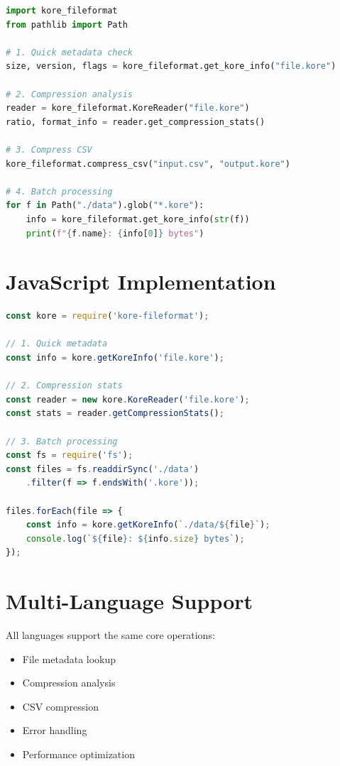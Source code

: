 \documentclass[12pt,a4paper]{report}
\begin{document}
\begin{lstlisting}[language=Python]
import kore_fileformat
from pathlib import Path

# 1. Quick metadata check
size, version, flags = kore_fileformat.get_kore_info("file.kore")

# 2. Compression analysis
reader = kore_fileformat.KoreReader("file.kore")
ratio, format_info = reader.get_compression_stats()

# 3. Compress CSV
kore_fileformat.compress_csv("input.csv", "output.kore")

# 4. Batch processing
for f in Path("./data").glob("*.kore"):
    info = kore_fileformat.get_kore_info(str(f))
    print(f"{f.name}: {info[0]} bytes")
\end{lstlisting}

\section{JavaScript Implementation}

\begin{lstlisting}[language=JavaScript]
const kore = require('kore-fileformat');

// 1. Quick metadata
const info = kore.getKoreInfo('file.kore');

// 2. Compression stats
const reader = new kore.KoreReader('file.kore');
const stats = reader.getCompressionStats();

// 3. Batch processing
const fs = require('fs');
const files = fs.readdirSync('./data')
    .filter(f => f.endsWith('.kore'));

files.forEach(file => {
    const info = kore.getKoreInfo(`./data/${file}`);
    console.log(`${file}: ${info.size} bytes`);
});
\end{lstlisting}

\section{Multi-Language Support}

All languages support the same core operations:

\begin{itemize}
    \item \checkmark{} File metadata lookup
    \item \checkmark{} Compression analysis
    \item \checkmark{} CSV compression
    \item \checkmark{} Error handling
    \item \checkmark{} Performance optimization
\end{itemize}
\end{document}
